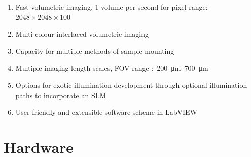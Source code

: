 \begin{enumerate}
    \item Fast volumetric imaging, 1 volume per second for pixel range:~\(2048\times2048\times100\)
    \item Multi-colour interlaced volumetric imaging
    \item Capacity for multiple methods of sample mounting
    \item Multiple imaging length scales, \gls{FOV} range :~\SIrange{200}{700}{\micro\meter} %
    \item Options for exotic illumination development through optional illumination paths to incorporate an \gls{SLM}
    \item User-friendly and extensible software scheme in \gls{LabVIEW}
\end{enumerate}

%
%
%
%
%

\section{Hardware}

